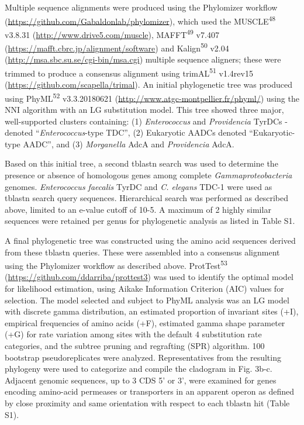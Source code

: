 \documentclass[11pt,]{article}
\begin{document}
Multiple sequence alignments were produced using the Phylomizer workflow
(\url{https://github.com/Gabaldonlab/phylomizer}), which used the
MUSCLE\textsuperscript{48} v3.8.31 (\url{http://www.drive5.com/muscle}),
MAFFT\textsuperscript{49} v7.407
(\url{https://mafft.cbrc.jp/alignment/software}) and
Kalign\textsuperscript{50} v2.04
(\url{http://msa.sbc.su.se/cgi-bin/msa.cgi}) multiple sequence aligners;
these were trimmed to produce a consensus alignment using
trimAL\textsuperscript{51} v1.4rev15
(\url{https://github.com/scapella/trimal}). An initial phylogenetic tree
was produced using PhyML\textsuperscript{52} v3.3.20180621
(\url{http://www.atgc-montpellier.fr/phyml/}) using the NNI algorithm
with an LG substitution model. This tree showed three major,
well-supported clusters containing: (1) \emph{Enterococcus} and
\textit{Providencia} TyrDCs - denoted ``\emph{Enterococcus}-type TDC'',
(2) Eukaryotic AADCs denoted ``Eukaryotic-type AADC'', and (3)
\emph{Morganella} AdcA and \textit{Providencia} AdcA.

Based on this initial tree, a second tblastn search was used to
determine the presence or absence of homologous genes among complete
\emph{Gammaproteobacteria} genomes. \emph{Enterococcus faecalis} TyrDC
and \textit{C. elegans} TDC-1 were used as tblastn search query
sequences. Hierarchical search was performed as described above, limited
to an e-value cutoff of 10-5. A maximum of 2 highly similar sequences
were retained per genus for phylogenetic analysis as listed in Table S1.

A final phylogenetic tree was constructed using the amino acid sequences
derived from these tblastn queries. These were assembled into a
consensus alignment using the Phylomizer workflow as described above.
ProtTest\textsuperscript{53}
(\url{https://github.com/ddarriba/prottest3}) was used to identify the
optimal model for likelihood estimation, using Aikake Information
Criterion (AIC) values for selection. The model selected and subject to
PhyML analysis was an LG model with discrete gamma distribution, an
estimated proportion of invariant sites (+I), empirical frequencies of
amino acids (+F), estimated gamma shape parameter (+G) for rate
variation among sites with the default 4 substitution rate categories,
and the subtree pruning and regrafting (SPR) algorithm. 100 bootstrap
pseudoreplicates were analyzed. Representatives from the resulting
phylogeny were used to categorize and compile the cladogram in Fig.
3b-c. Adjacent genomic sequences, up to 3 CDS 5' or 3', were examined
for genes encoding amino-acid permeases or transporters in an apparent
operon as defined by close proximity and same orientation with respect
to each tblastn hit (Table S1).
\end{document}
